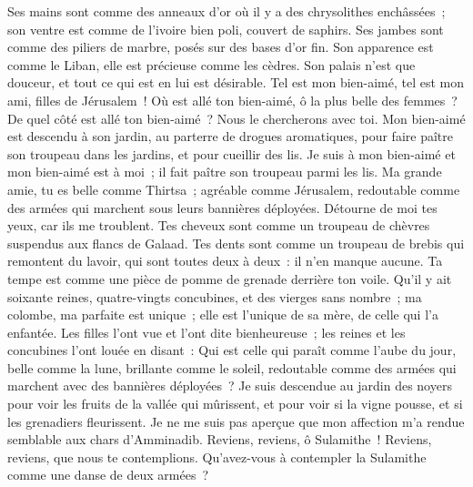 \begin{multicols}{2}
Ses mains sont comme des anneaux d'or où il y a des chrysolithes enchâssées~; son ventre est comme de l'ivoire bien poli, couvert de saphirs.
Ses jambes sont comme des piliers de marbre, posés sur des bases d'or fin. Son apparence est comme le Liban, elle est précieuse comme les cèdres.
Son palais n'est que douceur, et tout ce qui est en lui est désirable. Tel est mon bien-aimé, tel est mon ami, filles de Jérusalem~!
\VerseOne{} Où est allé ton bien-aimé, ô la plus belle des femmes~? De quel côté est allé ton bien-aimé~? Nous le chercherons avec toi.
 Mon bien-aimé est descendu à son jardin, au parterre de drogues aromatiques, pour faire paître son troupeau dans les jardins, et pour cueillir des lis.
Je suis à mon bien-aimé et mon bien-aimé est à moi~; il fait paître son troupeau parmi les lis.
 Ma grande amie, tu es belle comme Thirtsa~; agréable comme Jérusalem, redoutable comme des armées qui marchent sous leurs bannières déployées. 
Détourne de moi tes yeux, car ils me troublent. Tes cheveux sont comme un troupeau de chèvres suspendus aux flancs de Galaad.
Tes dents sont comme un troupeau de brebis qui remontent du lavoir, qui sont toutes deux à deux~: il n'en manque aucune.
Ta tempe est comme une pièce de pomme de grenade derrière ton voile.
Qu'il y ait soixante reines, quatre-vingts concubines, et des vierges sans nombre~;
ma colombe, ma parfaite est unique~; elle est l'unique de sa mère, de celle qui l'a enfantée. Les filles l'ont vue et l'ont dite bienheureuse~; les reines et les concubines l'ont louée en disant~:
Qui est celle qui paraît comme l'aube du jour, belle comme la lune, brillante comme le soleil, redoutable comme des armées qui marchent avec des bannières déployées~?
 Je suis descendue au jardin des noyers pour voir les fruits de la vallée qui mûrissent, et pour voir si la vigne pousse, et si les grenadiers fleurissent.
Je ne me suis pas aperçue que mon affection m'a rendue semblable aux chars d'Amminadib.
\VerseOne{} Reviens, reviens, ô Sulamithe~! Reviens, reviens, que nous te contemplions.  Qu'avez-vous à contempler la Sulamithe comme une danse de deux armées~?

\end{multicols}
